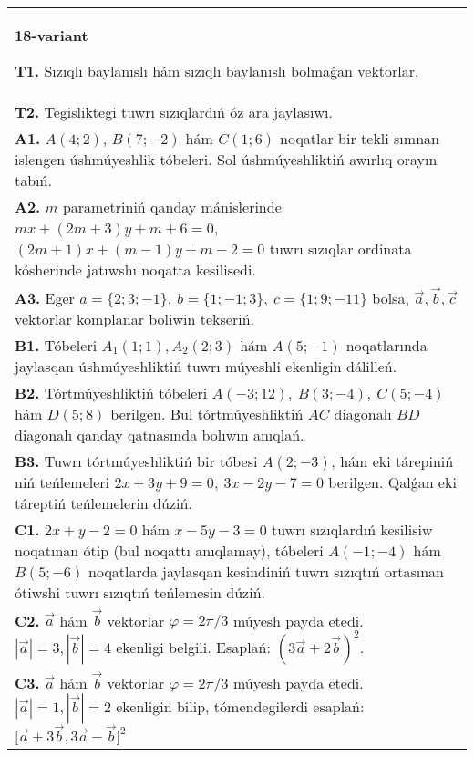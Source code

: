\documentclass{article}
\begin{document}
\begin{tabular}{m{17cm}}
\textbf{18-variant}

\textbf{T1.} 
Sızıqlı baylanıslı hám sızıqlı baylanıslı bolmaǵan vektorlar.
 \\
\textbf{T2.} 
Tegisliktegi tuwrı sızıqlardıń óz ara jaylasıwı.
 \\
\textbf{A1.} 
$A (4;2) $, $B (7;-2) $ hám $C (1;6) $ noqatlar bir tekli
sımnan islengen úshmúyeshlik tóbeleri. Sol úshmúyeshliktiń awırlıq orayın tabıń.
 \\
\textbf{A2.} 
$m$ parametriniń qanday mánislerinde
$mx+ (2m+3) y+m+6=0$, $ (2m+1) x+ (m-1) y+m-2=0$ tuwrı sızıqlar ordinata
kósherinde jatıwshı noqatta kesilisedi.
 \\
\textbf{A3.} 
Eger \(a = \{ 2;3; - 1\}, \ b = \{ 1; - 1;3\}, \ c = \{ 1;9; - 11\}\) bolsa, $\overrightarrow{a}, \overrightarrow{b}, \overrightarrow{c}$ vektorlar komplanar boliwin tekseriń.
 \\
\textbf{B1.} 
Tóbeleri $A_1 (1; 1), A_2 (2; 3) $ hám $A (5;-1) $
noqatlarında jaylasqan úshmúyeshliktiń tuwrı múyeshli ekenligin dálilleń.
 \\
\textbf{B2.} 
Tórtmúyeshliktiń tóbeleri
\(A (-3;12),\ B (3;-4),\ C (5;-4) \) hám \(D (5;8) \) berilgen. Bul
tórtmúyeshliktiń $AC$ diagonalı $BD$ diagonalı qanday
qatnasında bolıwın anıqlań.
 \\
\textbf{B3.} 
Tuwrı tórtmúyeshliktiń bir tóbesi \(A (2;-3) \), hám eki tárepiniń
niń teńlemeleri \(2x+3y+9=0,\ 3x-2y-7=0\)
berilgen. Qalǵan eki táreptiń teńlemelerin dúziń.
 \\
\textbf{C1.} 
\(2x+y-2=0\) hám \(x-5y-3=0\)
tuwrı sızıqlardıń kesilisiw noqatınan ótip (bul noqattı anıqlamay), tóbeleri
\(A (-1;-4) \) hám \(B (5;-6) \) noqatlarda jaylasqan kesindiniń
tuwrı sızıqtıń ortasınan ótiwshi tuwrı sızıqtıń teńlemesin dúziń.
 \\
\textbf{C2.} 
$\vec{a}$ hám $\vec{b}$ vektorlar $\varphi = 2\pi/3$ múyesh payda etedi. $|\vec{a}| = 3,|\vec{b}| = 4$ ekenligi belgili. Esaplań: $ (3\vec{a} + 2\vec{b}) ^{2}$.
 \\
\textbf{C3.} 
$\vec{a}$ hám $\vec{b}$ vektorlar $\varphi = 2\pi/3$ múyesh payda etedi. $|\vec{a}| = 1,|\vec{b}| = 2$ ekenligin bilip, tómendegilerdi esaplań:
$\lbrack\overrightarrow{a} + 3\overrightarrow{b},3\overrightarrow{a} - \overrightarrow{b}\rbrack^{2}$
 \\

\end{tabular}
\vspace{1cm}
\end{document}
